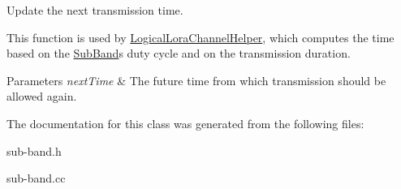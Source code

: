 Update the next transmission time.

This function is used by \hyperlink{classns3_1_1lorawan_1_1LogicalLoraChannelHelper}{Logical\+Lora\+Channel\+Helper}, which computes the time based on the \hyperlink{classns3_1_1lorawan_1_1SubBand}{Sub\+Band}\textquotesingle{}s duty cycle and on the transmission duration.


\begin{DoxyParams}{Parameters}
{\em next\+Time} & The future time from which transmission should be allowed again. \\
\hline
\end{DoxyParams}


The documentation for this class was generated from the following files\+:\begin{DoxyCompactItemize}
\item 
sub-\/band.\+h\item 
sub-\/band.\+cc\end{DoxyCompactItemize}
